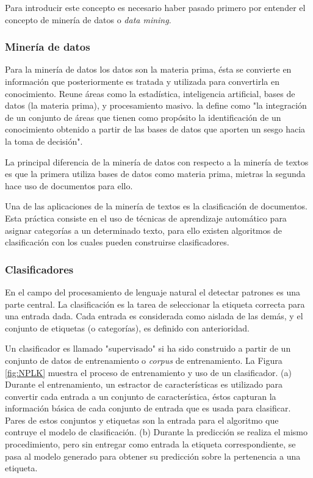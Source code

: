 Para introducir este concepto es necesario haber pasado primero por entender el concepto de minería de datos o \textit{data mining}.

\subsubsection*{Minería de datos}
\label{subsubsec:dataMining}

Para la minería de datos los datos son la materia prima, ésta se convierte en información que posteriormente es tratada y utilizada para convertirla en conocimiento. Reune áreas como la estadística, inteligencia artificial, bases de datos (la materia prima), y procesamiento masivo. \cite{LuisMolina} la define como "la integración de un conjunto de áreas que tienen como propósito la identificación de un conocimiento obtenido a partir de las bases de datos que aporten un sesgo hacia la toma de decisión".

La principal diferencia de la minería de datos con respecto a la minería de textos es que la primera utiliza bases de datos como materia prima, mietras la segunda hace uso de documentos para ello.

Una de las aplicaciones de la minería de textos es la clasificación de documentos. Esta práctica consiste en el uso de técnicas de aprendizaje automático para asignar categorías a un determinado texto, para ello existen algoritmos de clasificación con los cuales pueden construirse clasificadores.

\subsubsection*{Clasificadores}
\label{subsubsec:Classifiers}

En el campo del procesamiento de lenguaje natural el detectar patrones es una parte central. La clasificación es la tarea de seleccionar la etiqueta correcta para una entrada dada. Cada entrada es considerada como aislada de las demás, y el conjunto de etiquetas (o categorías), es definido con anterioridad.

Un clasificador es llamado "supervisado" si ha sido construido a partir de un conjunto de datos de entrenamiento o \textit{corpus} de entrenamiento. La Figura \ref{fig:NPLK} muestra el proceso de entrenamiento y uso de un clasificador. (a) Durante el entrenamiento, un estractor de características es utilizado para convertir cada entrada a un conjunto de característica, éstos capturan la información básica de cada conjunto de entrada que es usada para clasificar. Pares de estos conjuntos y etiquetas son la entrada para el algoritmo que contruye el modelo de clasificación. (b) Durante la predicción se realiza el mismo procedimiento, pero sin entregar como entrada la etiqueta correspondiente, se pasa al modelo generado para obtener su predicción sobre la pertenencia a una etiqueta.

